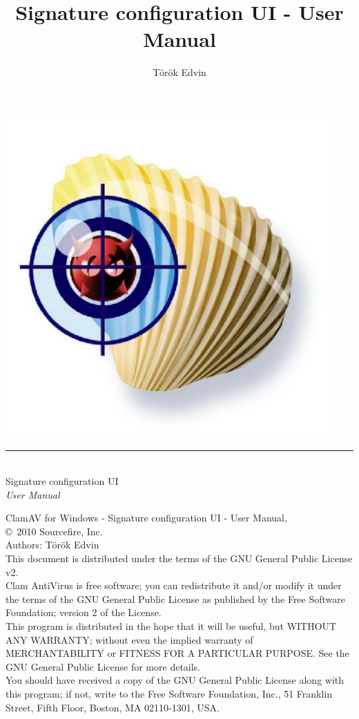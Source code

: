 \documentclass[a4paper,titlepage,english,12pt]{book}
\title{Signature configuration UI - User Manual}
\author{T\"{o}r\"{o}k Edvin}
\begin{document}
\setcounter{page}{0}
\pagestyle{empty}
\includegraphics[width=353pt]{clam}
\vspace{3cm}
\begin{flushright}
  \rule[-1ex]{8cm}{3pt}\\
  \huge Signature configuration UI\\
        \huge \emph{User Manual}\\
\end{flushright}
\newpage
\setcounter{page}{1}
\pagestyle{fancy}
\tableofcontents
\vspace{1.0cm}
\noindent
\begin{boxedminipage}[b]{\textwidth}
    ClamAV for Windows - Signature configuration UI - User Manual,\\
    \copyright \  2010 Sourcefire, Inc.\\
    Authors: T\"{o}r\"{o}k Edvin\\
    This document is distributed under the terms of the GNU General
    Public License v2.\\

    Clam AntiVirus is free software; you can redistribute it and/or modify
    it under the terms of the GNU General Public License as published by
    the Free Software Foundation; version 2 of the License.\\

    This program is distributed in the hope that it will be useful,
    but WITHOUT ANY WARRANTY; without even the implied warranty of
    MERCHANTABILITY or FITNESS FOR A PARTICULAR PURPOSE.  See the
    GNU General Public License for more details.\\

    You should have received a copy of the GNU General Public License
    along with this program; if not, write to the Free Software
    Foundation, Inc., 51 Franklin Street, Fifth Floor, Boston,
    MA 02110-1301, USA.
\end{boxedminipage}
\end{document}
